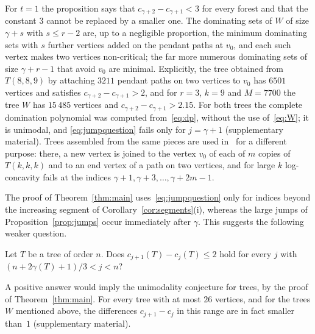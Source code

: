 \documentclass[smallextended,envcountsect,envcountsame]{svjour3}
\begin{document}
For $t=1$ the proposition says that $c_{\gamma+2}-c_{\gamma+1}<3$ for every
forest and that the constant $3$ cannot be replaced by a smaller one. The
dominating sets of $W$ of size $\gamma+s$ with $s\le r-2$ are, up to a
negligible proportion, the minimum dominating sets with $s$ further vertices
added on the pendant paths at $v_0$, and each such vertex makes two vertices
non-critical; the far more numerous dominating sets of size $\gamma+r-1$ that
avoid $v_0$ are minimal. Explicitly, the tree obtained from $T(8,8,9)$ by
attaching $3211$ pendant paths on two vertices to $v_0$ has $6501$ vertices
and satisfies $c_{\gamma+2}-c_{\gamma+1}>2$, and for $r=3$, $k=9$ and
$M=7700$ the tree $W$ has $15\,485$ vertices and
$c_{\gamma+2}-c_{\gamma+1}>2.15$. For both trees the complete domination
polynomial was computed from~\eqref{eq:dp}, without the use
of~\eqref{eq:W}; it is unimodal, and \eqref{eq:jumpquestion} fails only for
$j=\gamma+1$ (supplementary material). Trees assembled from the same pieces
are used in~\cite{DHP} for a different purpose: there, a new vertex is joined
to the vertex $v_0$ of each of $m$ copies of $T(k,k,k)$ and to an end vertex
of a path on two vertices, and for large $k$ log-concavity fails at the
indices $\gamma+1,\gamma+3,\dots,\gamma+2m-1$.

The proof of Theorem~\ref{thm:main} uses~\eqref{eq:jumpquestion} only for
indices beyond the increasing segment of Corollary~\ref{cor:segments}(i),
whereas the large jumps of Proposition~\ref{prop:jumps} occur immediately
after $\gamma$. This suggests the following weaker question.

\begin{question}\label{q:jump}
Let $T$ be a tree of order $n$. Does $c_{j+1}(T)-c_j(T)\le2$ hold for every
$j$ with $(n+2\gamma(T)+1)/3<j<n$?
\end{question}

A positive answer would imply the unimodality conjecture for trees, by the
proof of Theorem~\ref{thm:main}. For every tree with at most $26$
vertices, and for the trees $W$ mentioned above, the differences $c_{j+1}-c_j$
in this range are in fact smaller than~$1$ (supplementary material).
\end{document}
